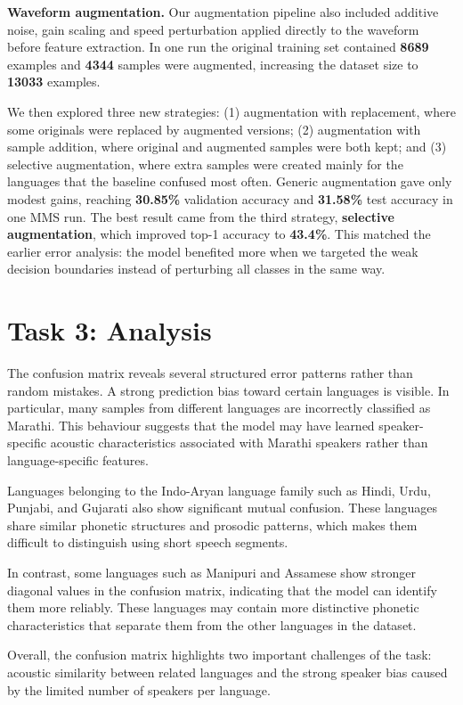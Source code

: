 \documentclass[11pt]{article}
\begin{document}
\textbf{Waveform augmentation.} Our augmentation pipeline also included additive noise, gain scaling and speed perturbation applied directly to the waveform before feature extraction. In one run the original training set contained \textbf{8689} examples and \textbf{4344} samples were augmented, increasing the dataset size to \textbf{13033} examples.

We then explored three new strategies: (1) augmentation with replacement, where some originals were replaced by augmented versions; (2) augmentation with sample addition, where original and augmented samples were both kept; and (3) selective augmentation, where extra samples were created mainly for the languages that the baseline confused most often. Generic augmentation gave only modest gains, reaching \textbf{30.85\%} validation accuracy and \textbf{31.58\%} test accuracy in one MMS run. The best result came from the third strategy, \textbf{selective augmentation}, which improved top-1 accuracy to \textbf{43.4\%}. This matched the earlier error analysis: the model benefited more when we targeted the weak decision boundaries instead of perturbing all classes in the same way.

\section{Task 3: Analysis}
The confusion matrix reveals several structured error patterns rather than random mistakes. A strong prediction bias toward certain languages is visible. In particular, many samples from different languages are incorrectly classified as Marathi. This behaviour suggests that the model may have learned speaker-specific acoustic characteristics associated with Marathi speakers rather than language-specific features.

Languages belonging to the Indo-Aryan language family such as Hindi, Urdu, Punjabi, and Gujarati also show significant mutual confusion. These languages share similar phonetic structures and prosodic patterns, which makes them difficult to distinguish using short speech segments. 

In contrast, some languages such as Manipuri and Assamese show stronger diagonal values in the confusion matrix, indicating that the model can identify them more reliably. These languages may contain more distinctive phonetic characteristics that separate them from the other languages in the dataset.

Overall, the confusion matrix highlights two important challenges of the task: acoustic similarity between related languages and the strong speaker bias caused by the limited number of speakers per language.
\end{document}
